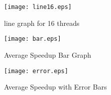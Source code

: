 \documentclass[a4paper, 10pt]{report}
\begin{document}
\begin{figure}
\centering
\texttt{[image: line16.eps]}
 \caption{line graph for 16 threads}
 \label{fig:line graph for 16 threads}
\end{figure}

\begin{figure}
\centering
\texttt{[image: bar.eps]}
 \caption{Average Speedup Bar Graph}
 \label{fig:Bar Graph for Average Speedup}
\end{figure}

\begin{figure}
\centering
\texttt{[image: error.eps]}
 \caption{Average Speedup with Error Bars}
 \label{fig:Average Speedup Bar Graph with Errors}
\end{figure}
\end{document}
